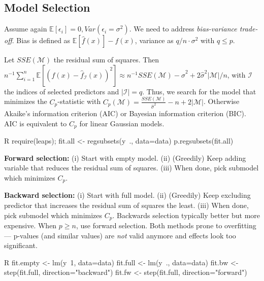 \subsection{Model Selection}\label{subsec:model_selection}
\begin{sectionbox}\nospacing{}
  Assume again $\mathbb{E}[\epsilon_{i}] = 0, Var(\epsilon_{i} = \sigma^{2})$.
  We need to address \emph{bias-variance trade-off}.
  Bias is defined as $\mathbb{E} [\hat f(x)] - f(x)$, variance as $q/n \cdot \sigma^{2}$ with $q \leq p$.
\end{sectionbox}
\begin{sectionbox}\nospacing{}
  Let $SSE(\mathcal{M})$ the residual sum of squares.
  Then $n^{-1} \sum_{i=1}^{n} \mathbb{E}\left[{(f(x) - \hat f_{\mathcal{I}}(x))}^{2}\right] \approx n^{-1}SSE(\mathcal{M})-\hat \sigma^{2} + 2\hat\sigma^{2}|\mathcal{M}|/n$, with $\mathcal{I}$ the indices of selected predictors and $|\mathcal{I}| = q$.
  Thus, we search for the model that minimizes the $C_{p}$-statistic with $C_{p}(\mathcal{M}) = \frac{SSE(\mathcal{M})}{\hat \sigma^{2}} - n + 2|\mathcal{M}|$.
  Otherwise Akaike's information criterion (AIC) or Bayesian information criterion (BIC). AIC is equivalent to $C_{p}$ for linear Gaussian models.
  \begin{mintlinebox}{R}
    require(leaps); fit.all <- regsubsets(y~., data=data)
    p.regsubsets(fit.all)
  \end{mintlinebox}
\end{sectionbox}
\begin{sectionbox}\nospacing{}
  \textbf{Forward selection:} (i) Start with empty model. (ii) (Greedily) Keep adding variable that reduces the residual sum of squares. (iii) When done, pick submodel which minimizes $C_{p}$.

  \textbf{Backward selection:} (i) Start with full model. (ii) (Greedily) Keep excluding predictor that increases the residual sum of squares the least. (iii) When done, pick submodel which minimizes $C_{p}$.
  Backwards selection typically better but more expensive. When $p \geq n$, use forward selection.
  Both methods prone to overfitting --- p-values (and similar values) are \emph{not} valid anymore and effects look too significant.
  \begin{mintlinebox}{R}
    fit.empty <- lm(y~1, data=data)
    fit.full <- lm(y~., data=data)
    fit.bw <- step(fit.full, direction="backward")
    fit.fw <- step(fit.full, direction="forward")
  \end{mintlinebox}

\end{sectionbox}

